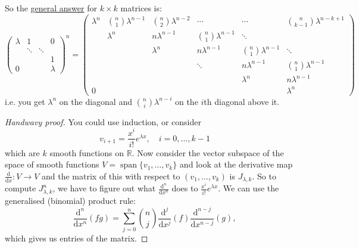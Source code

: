 \documentclass[a4paper]{article}
\newcommand{\spanset}{\operatorname{span}}
\theoremstyle{definition}
\begin{document}
So the \underline{general answer} for $k\times k$ matrices is:
\[
\begin{pmatrix}
\lambda & 1 & & 0 \\
& \ddots & \ddots & \\
&&& 1\\
0& & &\lambda
\end{pmatrix}^n = \begin{pmatrix}
\lambda^n &{n\choose 1}\lambda^{n-1}&{n\choose 2}\lambda^{n-2}&\cdots&\cdots&{n\choose k-1}\lambda^{n-k+1}\\
&\lambda^n &n\lambda^{n-1}&{n\choose 1}\lambda^{n-1}&\ddots&\\
&&\lambda^n &n\lambda^{n-1}&{n\choose 1}\lambda^{n-1}&\ddots\\
&&&\ddots &n\lambda^{n-1}&{n\choose 1}\lambda^{n-1}\\
&&&&\lambda ^n &n\lambda^{n-1}\\
0&&&&&\lambda ^n
\end{pmatrix}
\]
i.e. you get $\lambda^n$ on the diagonal and ${n\choose i}\lambda^{n-i}$ on the $i$th diagonal above it.

\begin{proof}[Handwavy proof]
You could use induction, or consider
\[
v_{i+1}=\frac{x^i}{i!}e^{\lambda x},\quad i=0,\ldots,k-1
\]
which are $k$ smooth functions on $\mathbb R$. Now consider the vector subspace of the space of smooth functions $V=\spanset \{v_1,\ldots,v_k\}$ and look at the derivative map $\frac{\mathrm d}{\mathrm d x}:V\rightarrow V$ and the matrix of this with respect to $(v_1,\ldots,v_k)$ is $J_{\lambda ,k}$. So to compute $J_{\lambda ,k}^n$, we have to figure out what $\displaystyle \frac{\mathrm d^n}{\mathrm d x^n}$ does to $\displaystyle \frac{x^i}{i!}e^{\lambda x}$. We can use the generalised (binomial) product rule:
\[
\frac{\mathrm d^n}{\mathrm d x^n}(fg)=\sum_{j=0}^n {n\choose j} \frac{\mathrm d ^j}{\mathrm d x^j} (f) \frac{\mathrm d^{n-j}}{\mathrm d x^{n-j}} (g),
\]
which gives us entries of the matrix.
\end{proof}
\end{document}
